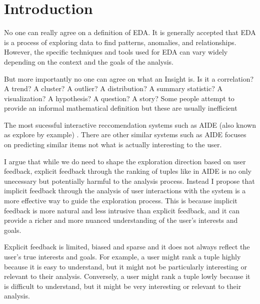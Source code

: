 \documentclass[sigconf, nonacm]{acmart}
\begin{document}
\section{Introduction}

No one can really agree on a definition of EDA. It is generally accepted that EDA is a process of exploring data to find patterns, anomalies, and relationships. However, the specific techniques and tools used for EDA can vary widely depending on the context and the goals of the analysis.


But more importantly no one can agree on what an Insight is. Is it a correlation? A trend? A cluster? A outlier? A distribution? A summary statistic? A visualization? A hypothesis? A question? A story? Some people attempt to provide an informal mathematical definition \cite{PDFExtractingTopK} but these are usually inefficient


The most sucessful interactive reccomendation systems such as AIDE (also known as explore by example) \cite{dimitriadouAIDEActiveLearningBased2016}. There are other similar systems such as
AIDE focuses on predicting similar items not what is actually interesting to the user. 

I argue that while we do need to shape the exploration direction based on user feedback, explicit feedback through the ranking of tuples like in AIDE \cite{dimitriadouAIDEActiveLearningBased2016} is no only unecessary but potentially harmful to the analysis process.
Instead I propose that implicit feedback through the analysis of user interactions with the system is a more effective way to guide the exploration process. This is because implicit feedback is more natural and less intrusive than explicit feedback, and it can provide a richer and more nuanced understanding of the user's interests and goals.

Explicit feedback is limited, biased and sparse and it does not always reflect the user's true interests and goals. For example, a user might rank a tuple highly because it is easy to understand, but it might not be particularly interesting or relevant to their analysis. Conversely, a user might rank a tuple lowly because it is difficult to understand, but it might be very interesting or relevant to their analysis.

\end{document}
